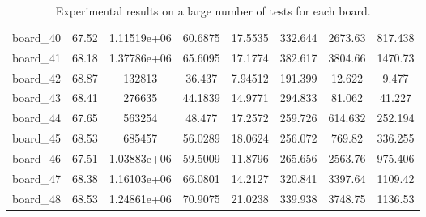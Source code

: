 \begin{table*}[!htbp]
\begin{center}
{\begin{tabular}{|c|c|cccc|cc|}
board\_40 & 67.52 & 1.11519e+06 & 60.6875 & 17.5535 & 332.644 & 2673.63 & 817.438 \\
board\_41 & 68.18 & 1.37786e+06 & 65.6095 & 17.1774 & 382.617 & 3804.66 & 1470.73 \\
board\_42 & 68.87 & 132813 & 36.437 & 7.94512 & 191.399 & 12.622 & 9.477 \\
board\_43 & 68.41 & 276635 & 44.1839 & 14.9771 & 294.833 & 81.062 & 41.227 \\
board\_44 & 67.65 & 563254 & 48.477 & 17.2572 & 259.726 & 614.632 & 252.194 \\
board\_45 & 68.53 & 685457 & 56.0289 & 18.0624 & 256.072 & 769.82 & 336.255 \\
board\_46 & 67.51 & 1.03883e+06 & 59.5009 & 11.8796 & 265.656 & 2563.76 & 975.406 \\
board\_47 & 68.38 & 1.16103e+06 & 66.0801 & 14.2127 & 320.841 & 3397.64 & 1109.42 \\
board\_48 & 68.53 & 1.24861e+06 & 70.9075 & 21.0238 & 339.938 & 3748.75 & 1136.53 \\
\hline
\end{tabular}
}
\caption{
  \label{tab:exp_board_large_tests}
  Experimental results on a large number of tests for each board.
}
\end{center}
\end{table*}


